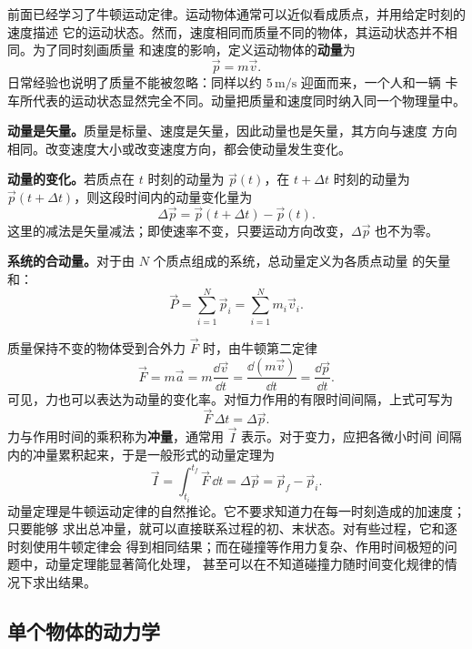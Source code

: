 前面已经学习了牛顿运动定律。运动物体通常可以近似看成质点，并用给定时刻的速度描述
它的运动状态。然而，速度相同而质量不同的物体，其运动状态并不相同。为了同时刻画质量
和速度的影响，定义运动物体的\textbf{动量}为
\begin{equation}
 \vec p=m\vec v.
\end{equation}
日常经验也说明了质量不能被忽略：同样以约 $5\,\mathrm{m/s}$ 迎面而来，一个人和一辆
卡车所代表的运动状态显然完全不同。动量把质量和速度同时纳入同一个物理量中。

\textbf{动量是矢量。}\quad 质量是标量、速度是矢量，因此动量也是矢量，其方向与速度
方向相同。改变速度大小或改变速度方向，都会使动量发生变化。

\textbf{动量的变化。}\quad 若质点在 $t$ 时刻的动量为 $\vec p(t)$，在
$t+\Delta t$ 时刻的动量为 $\vec p(t+\Delta t)$，则这段时间内的动量变化量为
\begin{equation}
 \Delta\vec p=\vec p(t+\Delta t)-\vec p(t).
\end{equation}
这里的减法是矢量减法；即使速率不变，只要运动方向改变，$\Delta\vec p$ 也不为零。

\textbf{系统的合动量。}\quad 对于由 $N$ 个质点组成的系统，总动量定义为各质点动量
的矢量和：
\begin{equation}
 \vec P=\sum_{i=1}^{N}\vec p_i=\sum_{i=1}^{N}m_i\vec v_i.
\end{equation}

质量保持不变的物体受到合外力 $\vec F$ 时，由牛顿第二定律
\begin{equation}
 \vec F=m\vec a=m\frac{\dd\vec v}{\dd t}
 =\frac{\dd(m\vec v)}{\dd t}
 =\frac{\dd\vec p}{\dd t}.
\end{equation}
可见，力也可以表达为动量的变化率。对恒力作用的有限时间间隔，上式可写为
\begin{equation}
 \vec F\,\Delta t=\Delta\vec p.
\end{equation}
力与作用时间的乘积称为\textbf{冲量}，通常用 $\vec I$ 表示。对于变力，应把各微小时间
间隔内的冲量累积起来，于是一般形式的动量定理为
\begin{equation}
 \vec I=\int_{t_i}^{t_f}\vec F\,\dd t
 =\Delta\vec p=\vec p_f-\vec p_i.
\end{equation}
动量定理是牛顿运动定律的自然推论。它不要求知道力在每一时刻造成的加速度；只要能够
求出总冲量，就可以直接联系过程的初、末状态。对有些过程，它和逐时刻使用牛顿定律会
得到相同结果；而在碰撞等作用力复杂、作用时间极短的问题中，动量定理能显著简化处理，
甚至可以在不知道碰撞力随时间变化规律的情况下求出结果。

\subsection{单个物体的动力学}

